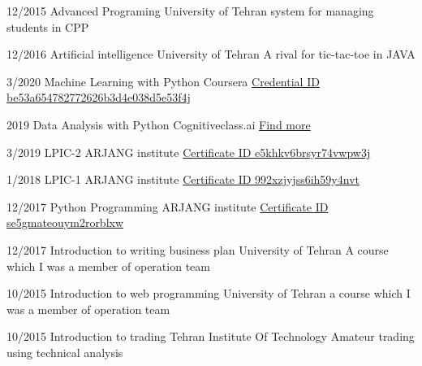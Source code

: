 \documentclass[9pt]{developercv}
\begin{document}

\begin{entrylist}
	\entry
	{12/2015}
	{Advanced Programing}
	{University of Tehran}
	{system for managing students in CPP}
\end{entrylist}
\begin{entrylist}
	\entry
	{12/2016}
	{Artificial intelligence}
	{University of Tehran}
	{A rival for tic-tac-toe in JAVA}
\end{entrylist}

\begin{entrylist}
	\entry
	{3/2020}
	{Machine Learning with Python}
	{Coursera}
	{{\href{https://www.coursera.org/account/accomplishments/records/8KNW27XHXTVF?utm_medium=Certificate&utm_source=link&utm_campaign=copybutton_Certificate}{Credential ID be53a654782772626b3d4e038d5e53f4j}}
	}
\end{entrylist}
\begin{entrylist}
	\entry
	{2019}
	{Data Analysis with Python}
	{Cognitiveclass.ai}
	{{\href{https://cognitiveclass.ai/courses/data-analysis-python}{Find more}}
	}
\end{entrylist}
\begin{entrylist}
	\entry
	{3/2019}
	{LPIC-2}
	{ARJANG institute}
	{{\href{http://gotoclass.ir/Certificates/e5khkv6brsyr74vwpw3j/}{Certificate ID e5khkv6brsyr74vwpw3j}}
	}
\end{entrylist}
\begin{entrylist}
	\entry
	{1/2018}
	{LPIC-1}
	{ARJANG institute}
	{{\href{http://gotoclass.ir/Certificates/992xzjyjss6ih59y4nvt/}{Certificate ID 992xzjyjss6ih59y4nvt}}
	}
\end{entrylist}
\begin{entrylist}
	\entry
	{12/2017}
	{Python Programming}
	{ARJANG institute}
	{{\href{http://gotoclass.ir/Certificates/se5gmateouym2rorblxw/}{Certificate ID se5gmateouym2rorblxw}}
	}
\end{entrylist}
\begin{entrylist}
	\entry
	{12/2017}
	{Introduction to writing business plan}
	{University of Tehran}
	{A course which I was a member of operation team}
\end{entrylist}
\begin{entrylist}
	\entry
	{10/2015}
	{Introduction to web programming}
	{University of Tehran}
	{a course which I was a member of operation team}
\end{entrylist}
\begin{entrylist}
	\entry
	{10/2015}
	{Introduction to trading}
	{Tehran Institute Of Technology}
	{Amateur trading using technical analysis}
\end{entrylist}
\end{document}
